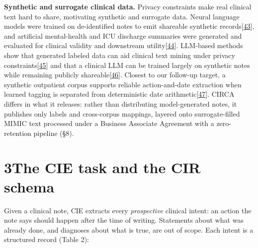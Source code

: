 \textbf{Synthetic and surrogate clinical data.} Privacy constraints make real clinical text hard to share, motivating synthetic and surrogate data. Neural language models were trained on de-identified notes to emit shareable synthetic records{[}\hyperref[r43]{43}{]}, and artificial mental-health and ICU discharge summaries were generated and evaluated for clinical validity and downstream utility{[}\hyperref[r44]{44}{]}. LLM-based methods show that generated labeled data can aid clinical text mining under privacy constraints{[}\hyperref[r45]{45}{]} and that a clinical LLM can be trained largely on synthetic notes while remaining publicly shareable{[}\hyperref[r46]{46}{]}. Closest to our follow-up target, a synthetic outpatient corpus supports reliable action-and-date extraction when learned tagging is separated from deterministic date arithmetic{[}\hyperref[r47]{47}{]}. CIRCA differs in what it releases: rather than distributing model-generated notes, it publishes only labels and cross-corpus mappings, layered onto surrogate-filled MIMIC text processed under a Business Associate Agreement with a zero-retention pipeline (§8).

\section{\texorpdfstring{{3}The CIE task and the CIR schema}{3The CIE task and the CIR schema}}\label{the-cie-task-and-the-cir-schema}

Given a clinical note, CIE extracts every \emph{prospective} clinical intent: an action the note says should happen after the time of writing. Statements about what was already done, and diagnoses about what is true, are out of scope. Each intent is a structured record (Table 2):

